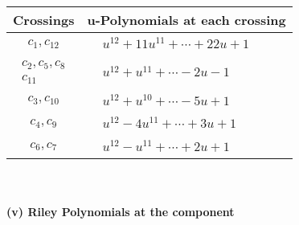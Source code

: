 \documentclass[1p]{elsarticle_modified}
\theoremstyle{definition}
\begin{document}
\begin{tabular}{m{50pt}|m{274pt}}
Crossings & \hspace{64pt}u-Polynomials at each crossing \\
\hline $$\begin{aligned}c_{1},c_{12}\end{aligned}$$&$\begin{aligned}
&u^{12}+11 u^{11}+\cdots+22 u+1
\end{aligned}$\\
\hline $$\begin{aligned}c_{2},c_{5},c_{8}\\c_{11}\end{aligned}$$&$\begin{aligned}
&u^{12}+u^{11}+\cdots-2 u-1
\end{aligned}$\\
\hline $$\begin{aligned}c_{3},c_{10}\end{aligned}$$&$\begin{aligned}
&u^{12}+u^{10}+\cdots-5 u+1
\end{aligned}$\\
\hline $$\begin{aligned}c_{4},c_{9}\end{aligned}$$&$\begin{aligned}
&u^{12}-4 u^{11}+\cdots+3 u+1
\end{aligned}$\\
\hline $$\begin{aligned}c_{6},c_{7}\end{aligned}$$&$\begin{aligned}
&u^{12}- u^{11}+\cdots+2 u+1
\end{aligned}$\\
\hline
\end{tabular}\\~\\
\newpage\renewcommand{\arraystretch}{1}
\flushleft \textbf{(v) Riley Polynomials at the component}\newline \\
\end{document}
